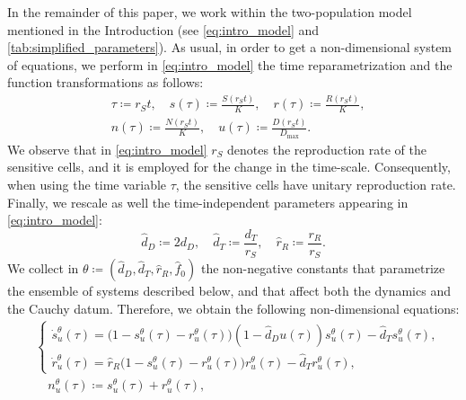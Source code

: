 \documentclass[a4paper,12pt, reqno]{amsart}
\theoremstyle{plain}
\theoremstyle{definition}
\theoremstyle{remark}
\numberwithin{equation}{section}
\begin{document}
{In the remainder of this paper, we work within the two-population model mentioned in the Introduction (see \cref{eq:intro_model} and \cref{tab:simplified_parameters}).}
{As usual, in order to get a non-dimensional system of equations, we perform in \cref{eq:intro_model} the time re\-parametrization and the function transformations as follows:
\begin{equation} \label{eq:non_dim_transform}
\begin{split} 
 &\tau \coloneqq r_S t, \quad s(\tau) \coloneqq \frac{S(r_S t)}{K}, \quad r(\tau) \coloneqq \frac{R(r_S t)}{K},\\
  &n(\tau) \coloneqq \frac{N(r_S t)}{K}, \quad u(\tau) \coloneqq \frac{D(r_S t)}{D_{\max}}.
\end{split}
\end{equation}
We observe that in \cref{eq:intro_model} $r_S$ denotes the reproduction rate of the sensitive cells, and it is employed for the change in the time-scale. Consequently, when using the time variable $\tau$, the sensitive cells have unitary reproduction rate.
Finally, we rescale as well the time-independent parameters appearing in \cref{eq:intro_model}:
\begin{equation}\label{eq:scaled_param}
    \hat d_D \coloneqq 2 d_D, \quad \hat d_T \coloneqq \frac{d_T}{r_S}, \quad \hat r_R \coloneqq \frac{r_R}{r_S}.
\end{equation}
We collect in $\theta \coloneqq (\hat d_D, \hat d_T, \hat r_R, \hat f_0)$ the non-negative constants that parametrize the ensemble of systems described below, and that affect both the dynamics and the Cauchy datum.
Therefore, we obtain the following non-dimensional {equations}:
\begin{equation} \label{eq:intro_model_nondim}
\begin{split}
     &\begin{cases}
        \dot s^\theta_u(\tau) = \big( 1 - s^\theta_u(\tau) - r^\theta_u(\tau) \big) \left( 1 - \hat d_D u(\tau) \right)s^\theta_u(\tau) - \hat d_T s^\theta_u(\tau), \\
     \dot r^\theta_u(\tau) = \hat r_R \big( 1 - s^\theta_u(\tau) - r^\theta_u(\tau) \big) r^\theta_u(\tau) - \hat d_T r^\theta_u(\tau), 
    \end{cases} \\
     &\quad n^\theta_u(\tau) \coloneqq s^\theta_u(\tau) + r^\theta_u(\tau),
\end{split}

\end{equation}}
\end{document}
